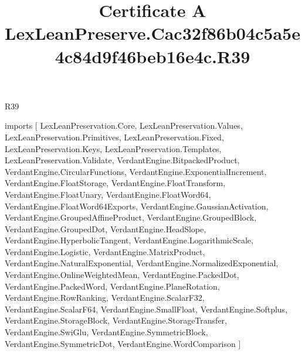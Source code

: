 \begin{lexlean}{R39}
\title{Certificate A LexLeanPreserve.Cac32f86b04c5a5e4c84d9f46beb16e4c.R39}
\begin{coremodule}
imports [
  LexLeanPreservation.Core,
  LexLeanPreservation.Values,
  LexLeanPreservation.Primitives,
  LexLeanPreservation.Fixed,
  LexLeanPreservation.Keys,
  LexLeanPreservation.Templates,
  LexLeanPreservation.Validate,
  VerdantEngine.BitpackedProduct,
  VerdantEngine.CircularFunctions,
  VerdantEngine.ExponentialIncrement,
  VerdantEngine.FloatStorage,
  VerdantEngine.FloatTransform,
  VerdantEngine.FloatUnary,
  VerdantEngine.FloatWord64,
  VerdantEngine.FloatWord64Exports,
  VerdantEngine.GaussianActivation,
  VerdantEngine.GroupedAffineProduct,
  VerdantEngine.GroupedBlock,
  VerdantEngine.GroupedDot,
  VerdantEngine.HeadSlope,
  VerdantEngine.HyperbolicTangent,
  VerdantEngine.LogarithmicScale,
  VerdantEngine.Logistic,
  VerdantEngine.MatrixProduct,
  VerdantEngine.NaturalExponential,
  VerdantEngine.NormalizedExponential,
  VerdantEngine.OnlineWeightedMean,
  VerdantEngine.PackedDot,
  VerdantEngine.PackedWord,
  VerdantEngine.PlaneRotation,
  VerdantEngine.RowRanking,
  VerdantEngine.ScalarF32,
  VerdantEngine.ScalarF64,
  VerdantEngine.SmallFloat,
  VerdantEngine.Softplus,
  VerdantEngine.StorageBlock,
  VerdantEngine.StorageTransfer,
  VerdantEngine.SwiGlu,
  VerdantEngine.SymmetricBlock,
  VerdantEngine.SymmetricDot,
  VerdantEngine.WordComparison
]


\end{coremodule}
\end{lexlean}
